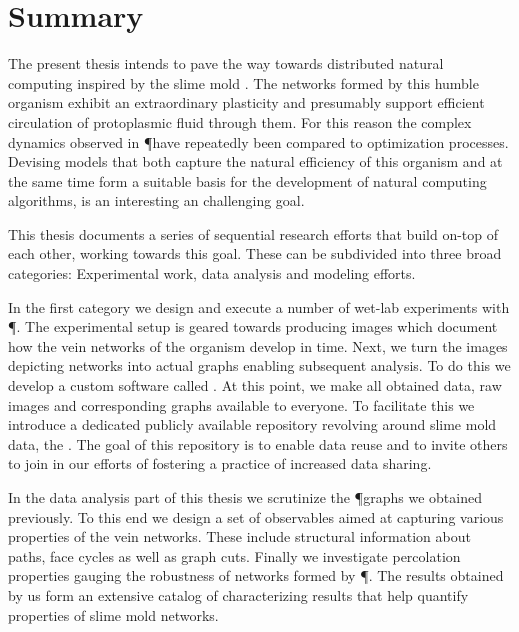 \chapter{Summary}

	
	The present thesis intends to pave the way towards distributed natural computing inspired by the slime mold \Pp. The networks formed by this humble organism exhibit an extraordinary plasticity and presumably support efficient circulation of protoplasmic fluid through them. For this reason the complex dynamics observed in \P have repeatedly been compared to optimization processes. 
	Devising models that both capture the natural efficiency of this organism and at the same time form a suitable basis for the development of natural computing algorithms, is an interesting an challenging goal.
	
	This thesis documents a series of sequential research efforts that build on-top of each other, working towards this goal. These can be subdivided into three broad categories: Experimental work, data analysis and modeling efforts.

	In the first category we design and execute a number of wet-lab experiments with \P. The experimental setup is geared towards producing images which document how the vein networks of the organism develop in time. Next, we turn the images depicting networks into actual graphs enabling subsequent analysis. To do this we develop a custom software called \NEFI. At this point, we make all obtained data, \ie raw images and corresponding graphs available to everyone. To facilitate this we introduce a dedicated publicly available repository revolving around slime mold data, the \SMGR. The goal of this repository is to enable data reuse and to invite others to join in our efforts of fostering a practice of increased data sharing.

	In the data analysis part of this thesis we scrutinize the \P graphs we obtained previously. To this end we design a set of observables aimed at capturing various properties of the vein networks. These include structural information about paths, face cycles as well as graph cuts. Finally we investigate percolation properties gauging the robustness of networks formed by \P. The results obtained by us form an extensive catalog of characterizing results that help quantify properties of slime mold networks.


